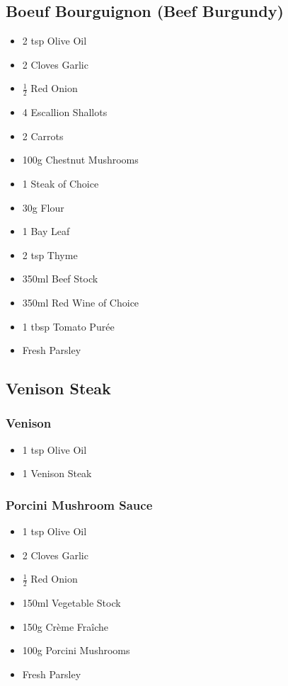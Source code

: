\documentclass[11pt, english]{article}
\begin{document}
\newpage

	\subsection{Boeuf Bourguignon (Beef Burgundy)}

	\begin{itemize}
	\setlength\itemsep{0cm}
		\item 2 tsp Olive Oil
		\item 2 Cloves Garlic
		\item $\frac{1}{2}$ Red Onion
		\item 4 Escallion Shallots
		\item 2 Carrots
		\item 100g Chestnut Mushrooms
		\item 1 Steak of Choice
		\item 30g Flour
		\item 1 Bay Leaf
		\item 2 tsp Thyme
		\item 350ml Beef Stock
		\item 350ml Red Wine of Choice
		\item 1 tbsp Tomato Pur\'{e}e 
		\item Fresh Parsley
	\end{itemize}

\newpage

	\subsection{Venison Steak}

		\subsubsection*{Venison}

	\begin{itemize}
        \setlength\itemsep{0cm}
                \item 1 tsp Olive Oil
		\item 1 Venison Steak
        \end{itemize}

		\subsubsection*{Porcini Mushroom Sauce}

	\begin{itemize}
        \setlength\itemsep{0cm}
                \item 1 tsp Olive Oil
		\item 2 Cloves Garlic
		\item $\frac{1}{2}$ Red Onion
		\item 150ml Vegetable Stock 
		\item 150g Cr\`{e}me Fra\^{i}che
		\item 100g Porcini Mushrooms
		\item Fresh Parsley
        \end{itemize}
\end{document}
